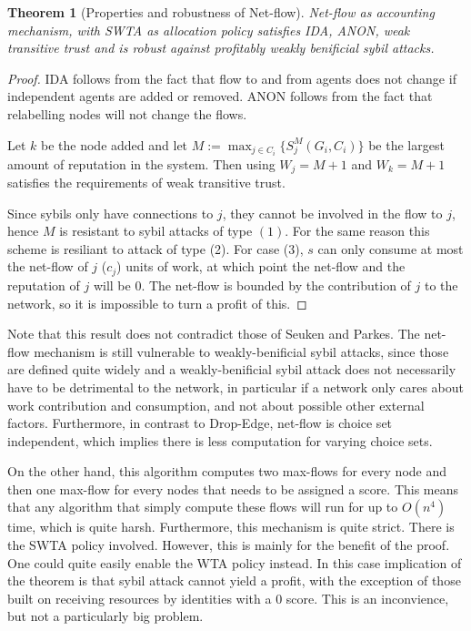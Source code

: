 \documentclass[a4paper,11pt]{book}
\newtheorem{theorem}{Theorem}
\theoremstyle{definition}
\begin{document}

\begin{theorem}[Properties and robustness of Net-flow]
    Net-flow as accounting mechanism, with SWTA as allocation policy
    satisfies IDA, ANON, weak transitive trust and is robust against
    profitably weakly benificial sybil attacks.

    \label{thm:prop-rob-net-flow}
\end{theorem}


\begin{proof}
    IDA follows from the fact that flow to and from agents does not change if independent agents
    are added or removed. ANON follows from the fact that relabelling nodes will not change the flows.

    Let $k$ be the node added and let 
    $M := \max_{j \in C_i}\{S^M_j(G_i, C_i)\}$ be the largest amount of reputation in the system.
    Then using $W_j = M+1$ and $W_k = M+1$ satisfies the requirements of weak transitive trust.

    Since sybils only have connections to $j$, they cannot be involved in the flow to $j$, hence
    $M$ is resistant to sybil attacks of type $(1)$. For the same reason this scheme is resiliant
    to attack of type (2). For case (3), $s$ can only consume at most the net-flow of $j$ ($c_j$)
    units of work, at which point the net-flow and the reputation of $j$ will be $0$. The net-flow
    is bounded by the contribution of $j$ to the network, so it is impossible to turn a profit of this.
\end{proof}

Note that this result does not contradict those of Seuken and Parkes. The net-flow mechanism is
still vulnerable to weakly-benificial sybil attacks, since those are defined quite widely and
a weakly-benificial sybil attack does not necessarily have to be detrimental to the network,
in particular if a network only cares about work contribution and consumption, and
not about possible other external factors. Furthermore, in contrast to Drop-Edge, net-flow
is choice set independent, which implies there is less computation for varying choice sets.


On the other hand, this algorithm computes two max-flows for every node and then one max-flow for
every nodes that needs to be assigned a score. This means that any algorithm that simply compute
these flows will run for up to $O(n^4)$ time, which is quite harsh. 
Furthermore, this mechanism is quite strict. There is the SWTA policy involved. However,
this is mainly for the benefit of the proof. One could quite easily enable the WTA policy instead.
In this case implication of the theorem is that sybil attack cannot yield a profit, with the exception
of those built on receiving resources by identities with a $0$ score. This is an inconvience,
but not a particularly big problem. 
\end{document}
